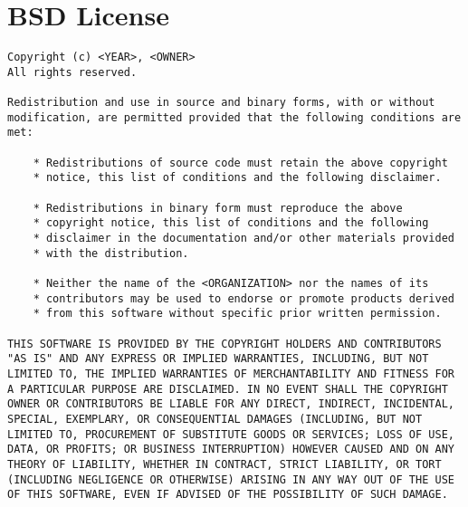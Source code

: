 \documentclass{InsightBook}
\begin{document}
\section{BSD License}
\begin{verbatim}
Copyright (c) <YEAR>, <OWNER>
All rights reserved.

Redistribution and use in source and binary forms, with or without
modification, are permitted provided that the following conditions are
met:

    * Redistributions of source code must retain the above copyright
    * notice, this list of conditions and the following disclaimer.

    * Redistributions in binary form must reproduce the above
    * copyright notice, this list of conditions and the following
    * disclaimer in the documentation and/or other materials provided
    * with the distribution.

    * Neither the name of the <ORGANIZATION> nor the names of its
    * contributors may be used to endorse or promote products derived
    * from this software without specific prior written permission.

THIS SOFTWARE IS PROVIDED BY THE COPYRIGHT HOLDERS AND CONTRIBUTORS
"AS IS" AND ANY EXPRESS OR IMPLIED WARRANTIES, INCLUDING, BUT NOT
LIMITED TO, THE IMPLIED WARRANTIES OF MERCHANTABILITY AND FITNESS FOR
A PARTICULAR PURPOSE ARE DISCLAIMED. IN NO EVENT SHALL THE COPYRIGHT
OWNER OR CONTRIBUTORS BE LIABLE FOR ANY DIRECT, INDIRECT, INCIDENTAL,
SPECIAL, EXEMPLARY, OR CONSEQUENTIAL DAMAGES (INCLUDING, BUT NOT
LIMITED TO, PROCUREMENT OF SUBSTITUTE GOODS OR SERVICES; LOSS OF USE,
DATA, OR PROFITS; OR BUSINESS INTERRUPTION) HOWEVER CAUSED AND ON ANY
THEORY OF LIABILITY, WHETHER IN CONTRACT, STRICT LIABILITY, OR TORT
(INCLUDING NEGLIGENCE OR OTHERWISE) ARISING IN ANY WAY OUT OF THE USE
OF THIS SOFTWARE, EVEN IF ADVISED OF THE POSSIBILITY OF SUCH DAMAGE.

\end{verbatim}
\end{document}
